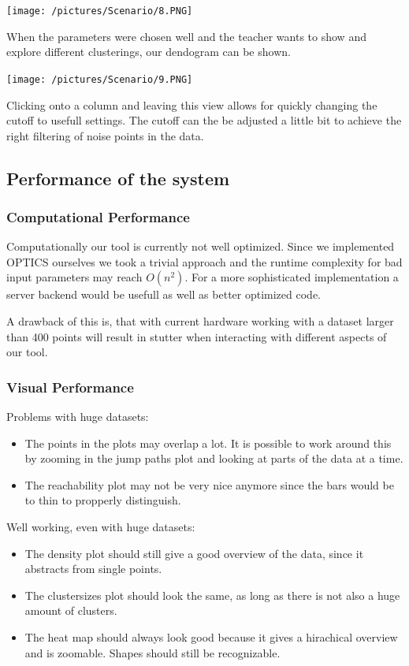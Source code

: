 \documentclass{vgtc}                          %
\begin{document}
\texttt{[image: /pictures/Scenario/8.PNG]}
\begin{flushleft}
When the parameters were chosen well and the teacher wants to show and explore different clusterings, our dendogram can be shown.
\end{flushleft}
\texttt{[image: /pictures/Scenario/9.PNG]}
\begin{flushleft}
Clicking onto a column and leaving this view allows for quickly changing the cutoff to usefull settings. The cutoff can the be adjusted a little bit to achieve the right filtering of noise points in the data.
\end{flushleft}

\subsection{Performance of the system}
\subsubsection{Computational Performance}
\begin{flushleft}
Computationally our tool is currently not well optimized. Since we implemented OPTICS ourselves we took a trivial approach and the runtime complexity for bad input parameters may reach $ O(n^{2}) $. For a more sophisticated implementation a server backend would be usefull as well as better optimized code.
\end{flushleft}
\begin{flushleft}
A drawback of this is, that with current hardware working with a dataset larger than 400 points will result in stutter when interacting with different aspects of our tool.
\end{flushleft}
\subsubsection{Visual Performance}
 Problems with huge datasets:
\begin{itemize}
\item The points in the plots may overlap a lot. It is possible to work around this by zooming in the jump paths plot and looking at parts of the data at a time.
\item The reachability plot may not be very nice anymore since the bars would be to thin to propperly distinguish.
\end{itemize}
Well working, even with huge datasets:
\begin{itemize}
\item The density plot should still give a good overview of the data, since it abstracts from single points.
\item The clustersizes plot should look the same, as long as there is not also a huge amount of clusters.
\item The heat map should always look good because it gives a hirachical overview and is zoomable. Shapes should still be recognizable.
\end{itemize}
\end{document}

